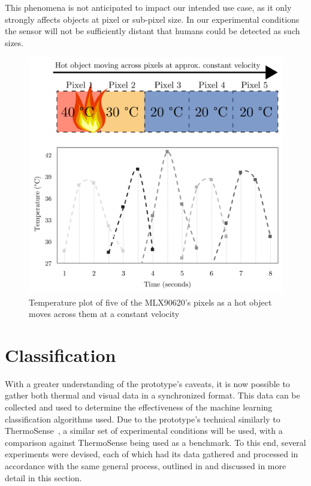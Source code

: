\documentclass[../thesis/thesis.tex]{subfiles}
\begin{document}
This phenomena is not anticipated to impact our intended use case, as it only strongly affects objects at pixel or sub-pixel size. In our experimental conditions the sensor will not be sufficiently distant that humans could be detected as such sizes.

\begin{figure}
\centering
\includegraphics[width=\textwidth]{../diagrams/03_hot_water_top_row_modified2.pdf}
\caption{Temperature plot of five of the MLX90620's pixels as a hot object moves across them at a constant velocity}
\label{fig:hotmotion}
\end{figure}


\section{Classification}
With a greater understanding of the prototype's caveats, it is now possible to gather both thermal and visual data in a synchronized format. This data can be collected and used to determine the effectiveness of the machine learning classification algorithms used. Due to the prototype's technical similarly to ThermoSense~\cite{beltran2013thermosense}, a similar set of experimental conditions will be used, with a comparison against ThermoSense being used as a benchmark. To this end, several experiments were devised, each of which had its data gathered and processed in accordance with the same general process, outlined in  and discussed in more detail in this section.
\end{document}
